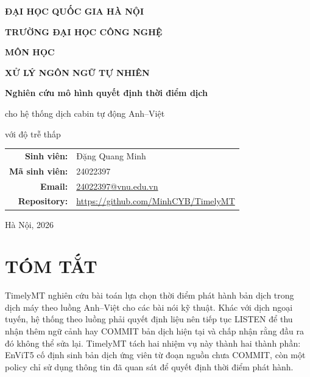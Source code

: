 \documentclass[11pt,a4paper]{article}
\numberwithin{figure}{section}
\numberwithin{table}{section}
\begin{document}

\hypersetup{pageanchor=false}
\begin{titlepage}
  \thispagestyle{empty}
  \begin{center}
    {\large\bfseries ĐẠI HỌC QUỐC GIA HÀ NỘI\par}
    \vspace{0.3em}
    {\large\bfseries TRƯỜNG ĐẠI HỌC CÔNG NGHỆ\par}

    \vspace{1.8cm}
    {\large\bfseries MÔN HỌC\par}
    \vspace{0.3em}
    {\Large\bfseries XỬ LÝ NGÔN NGỮ TỰ NHIÊN\par}

    \vfill
    \begin{minipage}{0.94\textwidth}
      \centering\LARGE\bfseries
      Nghiên cứu mô hình quyết định thời điểm dịch\par
      \vspace{0.3em}
      cho hệ thống dịch cabin tự động Anh--Việt\par
      \vspace{0.3em}
      với độ trễ thấp\par
    \end{minipage}
    \vfill

    \begin{tabular}{@{}rl@{}}
      \textbf{Sinh viên:} & Đặng Quang Minh \\
      \textbf{Mã sinh viên:} & 24022397 \\
      \textbf{Email:} & \href{mailto:24022397@vnu.edu.vn}{24022397@vnu.edu.vn} \\
      \textbf{Repository:} & \url{https://github.com/MinhCYB/TimelyMT}
    \end{tabular}

    \vfill
    {\large Hà Nội, 2026\par}
  \end{center}
\end{titlepage}
\hypersetup{pageanchor=true}

\section*{TÓM TẮT}

TimelyMT nghiên cứu bài toán lựa chọn thời điểm phát hành bản dịch trong dịch máy theo luồng Anh--Việt cho các bài nói kỹ thuật. Khác với dịch ngoại tuyến, hệ thống theo luồng phải quyết định liệu nên tiếp tục LISTEN để thu nhận thêm ngữ cảnh hay COMMIT bản dịch hiện tại và chấp nhận rằng đầu ra đó không thể sửa lại. TimelyMT tách hai nhiệm vụ này thành hai thành phần: EnViT5 cố định sinh bản dịch ứng viên từ đoạn nguồn chưa COMMIT, còn một policy chỉ sử dụng thông tin đã quan sát để quyết định thời điểm phát hành.
\end{document}
